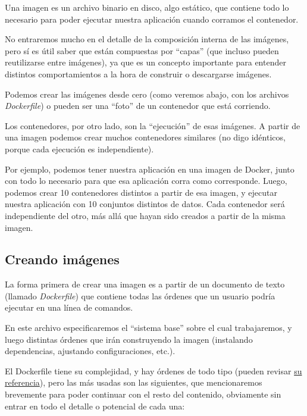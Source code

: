 Una imagen es un archivo binario en disco, algo estático, que contiene todo lo necesario para poder ejecutar nuestra aplicación cuando corramos el contenedor.

No entraremos mucho en el detalle de la composición interna de las imágenes, pero sí es útil saber que están compuestas por ``capas'' (que incluso pueden reutilizarse entre imágenes), ya que es un concepto importante para entender distintos comportamientos a la hora de construir o descargarse imágenes.

Podemos crear las imágenes desde cero (como veremos abajo, con los archivos \textit{Dockerfile}) o pueden ser una ``foto'' de un contenedor que está corriendo.

Los contenedores, por otro lado, son la ``ejecución'' de esas imágenes. A partir de una imagen podemos crear muchos contenedores similares (no digo idénticos, porque cada ejecución es independiente).

Por ejemplo, podemos tener nuestra aplicación en una imagen de Docker, junto con todo lo necesario para que esa aplicación corra como corresponde. Luego, podemos crear 10 contenedores distintos a partir de esa imagen, y ejecutar nuestra aplicación con 10 conjuntos distintos de datos. Cada contenedor será independiente del otro, más allá que hayan sido creados a partir de la misma imagen.


\subsection{Creando imágenes}

La forma primera de crear una imagen es a partir de un documento de texto (llamado \textit{Dockerfile}) que contiene todas las órdenes que un usuario podría ejecutar en una línea de comandos.

En este archivo especificaremos el ``sistema base'' sobre el cual trabajaremos, y luego distintas órdenes que irán construyendo la imagen (instalando dependencias, ajustando configuraciones, etc.).

El Dockerfile tiene su complejidad, y hay órdenes de todo tipo (pueden revisar \href{https://docs.docker.com/engine/reference/builder/}{su referencia}), pero las más usadas son las siguientes, que mencionaremos brevemente para poder continuar con el resto del contenido, obviamente sin entrar en todo el detalle o potencial de cada una:

